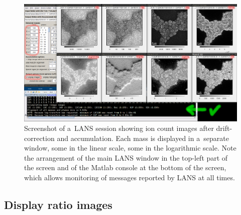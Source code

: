 \begin{figure}[!ht]
\centering
\includegraphics[width=\textwidth]{figs3/LANS-display-masses}
\caption{\label{fig:display-masses}%
Screenshot of a~LANS session showing ion count images after drift-correction and accumulation. Each mass is displayed in a~separate window, some in the linear scale, some in the logarithmic scale. Note the arrangement of the main LANS window in the top-left part of the screen and of the Matlab console at the bottom of the screen, which allows monitoring of messages reported by LANS at all times.}
\end{figure}




\subsection{Display ratio images}
\setcounter{step}{0}

\vskip2.5mm

